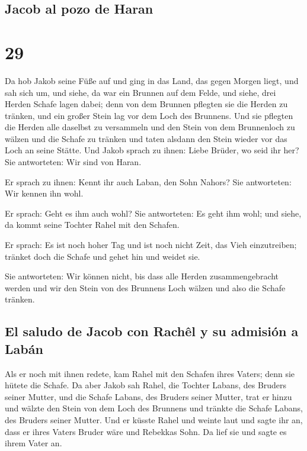 \hypertarget{jacob-al-pozo-de-haran}{%
\subsection{Jacob al pozo de Haran}\label{jacob-al-pozo-de-haran}}

\hypertarget{section-28}{%
\section{29}\label{section-28}}

 Da hob Jakob seine Füße auf und ging in das Land, das
gegen Morgen liegt,  und sah sich um, und siehe, da war
ein Brunnen auf dem Felde, und siehe, drei Herden Schafe lagen dabei;
denn von dem Brunnen pflegten sie die Herden zu tränken, und ein großer
Stein lag vor dem Loch des Brunnens.  Und sie pflegten die
Herden alle daselbst zu versammeln und den Stein von dem Brunnenloch zu
wälzen und die Schafe zu tränken und taten alsdann den Stein wieder vor
das Loch an seine Stätte.  Und Jakob sprach zu ihnen:
Liebe Brüder, wo seid ihr her? Sie antworteten: Wir sind von Haran.

 Er sprach zu ihnen: Kennt ihr auch Laban, den Sohn
Nahors? Sie antworteten: Wir kennen ihn wohl.

 Er sprach: Geht es ihm auch wohl? Sie antworteten: Es
geht ihm wohl; und siehe, da kommt seine Tochter Rahel mit den Schafen.

 Er sprach: Es ist noch hoher Tag und ist noch nicht Zeit,
das Vieh einzutreiben; tränket doch die Schafe und gehet hin und weidet
sie.

 Sie antworteten: Wir können nicht, bis dass alle Herden
zusammengebracht werden und wir den Stein von des Brunnens Loch wälzen
und also die Schafe tränken.

\hypertarget{el-saludo-de-jacob-con-rachuxeal-y-su-admisiuxf3n-a-labuxe1n}{%
\subsection{El saludo de Jacob con Rachêl y su admisión a
Labán}\label{el-saludo-de-jacob-con-rachuxeal-y-su-admisiuxf3n-a-labuxe1n}}

 Als er noch mit ihnen redete, kam Rahel mit den Schafen
ihres Vaters; denn sie hütete die Schafe.  Da aber Jakob
sah Rahel, die Tochter Labans, des Bruders seiner Mutter, und die Schafe
Labans, des Bruders seiner Mutter, trat er hinzu und wälzte den Stein
von dem Loch des Brunnens und tränkte die Schafe Labans, des Bruders
seiner Mutter.  Und er küsste Rahel und weinte laut
 und sagte ihr an, dass er ihres Vaters Bruder wäre und
Rebekkas Sohn. Da lief sie und sagte es ihrem Vater an.

